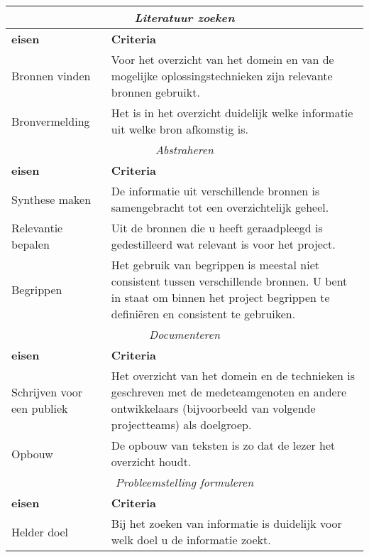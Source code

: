 \par{\small\sf
\begin{center}
\begin{tabular}{|p{7em}|p{25em}|}
\hline
\multicolumn{2}{|c|}{\emph{Literatuur zoeken}}\\\hline
{\bf eisen} & {\bf Criteria}\\\hline
Bronnen vinden & Voor het overzicht van het domein en van de mogelijke oplossingstechnieken zijn
		    relevante bronnen gebruikt.
\\\hline
Bronvermelding & Het is in het overzicht duidelijk welke informatie uit welke bron afkomstig is.
\\\hline
\multicolumn{2}{|c|}{\emph{Abstraheren}}\\\hline
{\bf eisen} & {\bf Criteria}\\\hline
Synthese maken & De informatie uit verschillende bronnen is samengebracht tot
		een overzichtelijk geheel.
\\\hline
Relevantie bepalen & Uit de bronnen die u heeft geraadpleegd is gedestilleerd wat relevant is voor
		    het project.
\\\hline
Begrippen & Het gebruik van begrippen is meestal niet consistent tussen verschillende
bronnen. U bent in staat om binnen het project begrippen te definiëren en
consistent te gebruiken.
\\\hline
\multicolumn{2}{|c|}{\emph{Documenteren}}\\\hline
{\bf eisen} & {\bf Criteria}\\\hline
Schrijven voor een publiek & Het overzicht van het domein en de technieken is geschreven met de
		medeteamgenoten en andere ontwikkelaars (bijvoorbeeld van volgende projectteams)
		als doelgroep.
\\\hline
Opbouw & De opbouw van teksten is zo dat de lezer het overzicht houdt.
\\\hline
\multicolumn{2}{|c|}{\emph{Probleemstelling formuleren}}\\\hline
{\bf eisen} & {\bf Criteria}\\\hline
Helder doel & Bij het zoeken van informatie is duidelijk voor welk doel u de informatie zoekt.
\\\hline
\end{tabular}
\end{center}
}%